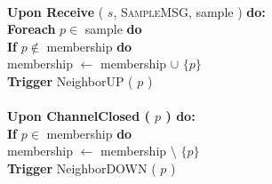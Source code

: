 \documentclass[10pt,a4paper]{article}
\begin{document}
\begin{algorithm}[h!]
\begin{tabbing}
~\\
\> \textbf{Upon Receive} ( $s$, \textsc{SampleMSG}, sample ) \textbf{do:}\\
\> \> \textbf{Foreach} $p \in $ sample \textbf{do}\\
\> \> \> \textbf{If} $p \notin$ membership \textbf{do}\\
\> \> \> \> membership $\longleftarrow$ membership $\cup$ $\{ p \}$\\ 
\> \> \> \> \textbf{Trigger} NeighborUP ( $p$ ) \\
~\\
\> \textbf{Upon ChannelClosed ( $p$ ) do:}\\
\> \> \textbf{If} $p \in$ membership \textbf{do}\\
\> \> \> membership $\longleftarrow$ membership $\setminus$ $\{ p \}$\\ 
\> \> \> \textbf{Trigger} NeighborDOWN ( $p$ )
\end{tabbing}
\end{algorithm} 
\end{document}
